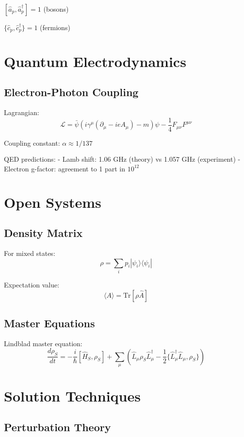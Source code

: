 \documentclass[12pt]{article}
\begin{document}
$[\hat{a}_p, \hat{a}_p^\dagger] = 1$ (bosons)

$\{\hat{c}_p, \hat{c}_p^\dagger\} = 1$ (fermions)

\section{Quantum Electrodynamics}

\subsection{Electron-Photon Coupling}

Lagrangian:
\[
\mathcal{L} = \bar{\psi}(i\gamma^\mu(\partial_\mu - ieA_\mu) - m)\psi - \frac{1}{4}F_{\mu\nu}F^{\mu\nu}
\]

Coupling constant: $\alpha \approx 1/137$

QED predictions:
- Lamb shift: 1.06 GHz (theory) vs 1.057 GHz (experiment)
- Electron g-factor: agreement to 1 part in $10^{12}$

\section{Open Systems}

\subsection{Density Matrix}

For mixed states:
\[
\rho = \sum_i p_i |\psi_i\rangle\langle\psi_i|
\]

Expectation value:
\[
\langle A\rangle = \text{Tr}[\rho\hat{A}]
\]

\subsection{Master Equations}

Lindblad master equation:
\[
\frac{d\rho_S}{dt} = -\frac{i}{\hbar}[\hat{H}_S, \rho_S] + \sum_\mu\left(\hat{L}_\mu\rho_S\hat{L}_\mu^\dagger - \frac{1}{2}\{\hat{L}_\mu^\dagger\hat{L}_\mu, \rho_S\}\right)
\]

\section{Solution Techniques}

\subsection{Perturbation Theory}
\end{document}
